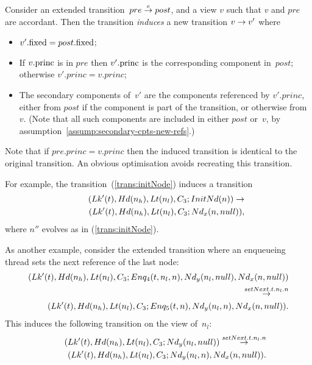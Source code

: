 \begin{definition}
\label{def:induced-transition}
Consider an extended transition~$pre \stackrel{e}\rightarrow post$, and a view $v$ such that
$v$ and $pre$ are accordant.  Then the  transition \emph{induces} a
new transition $v \stackrel{}\rightarrow v'$ where
\begin{itemize}
\item $v'.\mathrm{fixed} = post.\mathrm{fixed}$;

\item If $v.\mathrm{princ}$ is in $pre$ then $v'.\mathrm{princ}$ is the corresponding
  component in~$post$; otherwise $v'.princ = v.princ$;

\item The secondary components of~$v'$ are the components referenced by
  $v'.princ$, either from $post$ if the component is part of the transition,
  or otherwise from~$v$.  (Note that all such components are included in
  either $post$ or~$v$, by assumption~\ref{assump:secondary-cpts-new-refs}.)
\end{itemize}
\end{definition}

Note that if $pre.princ = v.princ$ then the induced transition is identical to
the original transition.  An obvious optimisation avoids recreating this
transition. 

For example, the  transition~(\ref{trans:initNode}) induces a transition
\[
\begin{align}
(Lk'(t), Hd(n_h), Lt(n_l), C_3; InitNd(n)) \stackrel{}\rightarrow \\
\qquad  (Lk'(t), Hd(n_h), Lt(n_l), C_3; Nd_x(n, null)),
\end{align}
\]
where $n''$ evolves as in (\ref{trans:initNode}).

As another example, consider the extended transition where an enqueueing
thread sets the next reference of the last node:
\[
\begin{align}
(Lk'(t), Hd(n_h), Lt(n_l), C_3;  
  Enq_4(t, n_l, n), Nd_y(n_l, null), Nd_x(n, null)) \\
\qquad \stackrel{setNext.t.n_l.n}\rightarrow \\
\qquad (Lk'(t), Hd(n_h), Lt(n_l), C_3;  
  Enq_5(t, n), Nd_y(n_l, n), Nd_x(n, null)).
\end{align}
\]
This induces the following transition on the view of~$n_l$:
\[
\begin{align}
(Lk'(t), Hd(n_h), Lt(n_l), C_3;  
  Nd_y(n_l, null))
\stackrel{setNext.t.n_l.n}\rightarrow \\
\qquad (Lk'(t), Hd(n_h), Lt(n_l), C_3;  
  Nd_y(n_l, n), Nd_x(n, null)).
\end{align}
\]


